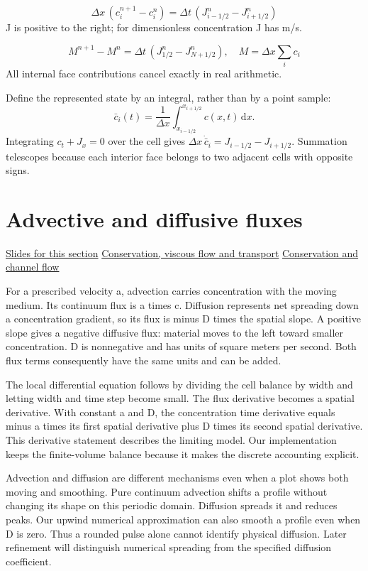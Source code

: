 \documentclass[11pt,letterpaper]{article}
\theoremstyle{definition}\newtheorem{definition}{Definition}\newtheorem{example}{Example}
\numberwithin{equation}{section}
\begin{document}
\[
\Delta x\,(c_i^{n+1}-c_i^n)=\Delta t\,(J_{i-1/2}^n-J_{i+1/2}^n)
\]
J is positive to the right; for dimensionless concentration J has m/s.

\[
M^{n+1}-M^n=\Delta t\,(J_{1/2}^n-J_{N+1/2}^n),\quad M=\Delta x\sum_i c_i
\]
All internal face contributions cancel exactly in real arithmetic.

Define the represented state by an integral, rather than by a point sample:
\[
 \bar c_i(t)=\frac1{\Delta x}\int_{x_{i-1/2}}^{x_{i+1/2}}c(x,t)\,\mathrm dx.
\]
Integrating $c_t+J_x=0$ over the cell gives $\Delta x\,\dot{\bar c}_i=J_{i-1/2}-J_{i+1/2}$. Summation telescopes because each interior face belongs to two adjacent cells with opposite signs.
\section{Advective and diffusive fluxes}
\hypertarget{note-advective-and-diffusive-fluxes}{}\label{note:advective-and-diffusive-fluxes}
{\small \href{slides.html\#frame=constitutive-transport-flux-figure\&step=1}{Slides for this section} \quad \href{../modules/cfd/index.html}{Conservation, viscous flow and transport} \quad \href{../modules/animations/conservation-flow.html}{Conservation and channel flow}}\par
For a prescribed velocity a, advection carries concentration with the moving medium. Its continuum flux is a times c. Diffusion represents net spreading down a concentration gradient, so its flux is minus D times the spatial slope. A positive slope gives a negative diffusive flux: material moves to the left toward smaller concentration. D is nonnegative and has units of square meters per second. Both flux terms consequently have the same units and can be added.

The local differential equation follows by dividing the cell balance by width and letting width and time step become small. The flux derivative becomes a spatial derivative. With constant a and D, the concentration time derivative equals minus a times its first spatial derivative plus D times its second spatial derivative. This derivative statement describes the limiting model. Our implementation keeps the finite-volume balance because it makes the discrete accounting explicit.

Advection and diffusion are different mechanisms even when a plot shows both moving and smoothing. Pure continuum advection shifts a profile without changing its shape on this periodic domain. Diffusion spreads it and reduces peaks. Our upwind numerical approximation can also smooth a profile even when D is zero. Thus a rounded pulse alone cannot identify physical diffusion. Later refinement will distinguish numerical spreading from the specified diffusion coefficient.
\end{document}
